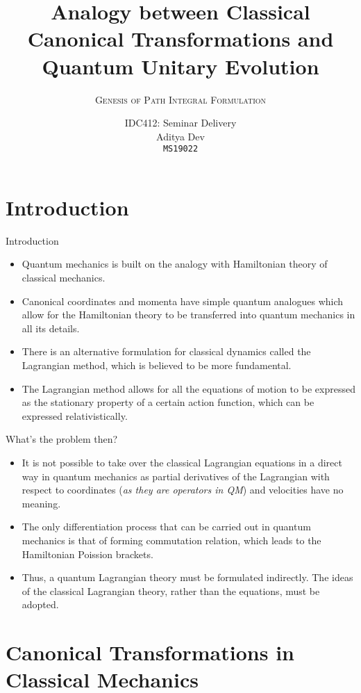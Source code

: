 \documentclass{beamer}
\title{Analogy between Classical Canonical Transformations and Quantum Unitary Evolution}
\author[Abbr]{\large{IDC412: Seminar Delivery} \\
  [5pt] {\Large Aditya Dev} \\
  [5pt] \texttt{MS19022}}
\subtitle{\textsc{Genesis of Path Integral Formulation}}
\institute{%
 {Department of Physical Sciences}\\
 [5pt]\textsc{Indian Institute of Science Education and Research Mohali} \\
        [5pt]{Email: \texttt{ms19022@iisermohali.ac.in} }
        }
\begin{document}

\typesetFrontSlides

%
%
    
\section{Introduction}



\begin{frame}{Introduction}
\begin{itemize}
    \item  Quantum mechanics is built on the analogy with Hamiltonian theory of classical mechanics.
    \item  Canonical coordinates and momenta have simple quantum analogues which allow for the Hamiltonian theory to be transferred into quantum mechanics in all its details.
    \item There is an alternative formulation for classical dynamics called the Lagrangian method, which is believed to be more fundamental.
    \item The Lagrangian method allows for all the equations of motion to be expressed as the stationary property of a certain action function, which can be expressed relativistically.
\end{itemize}
\end{frame}
\begin{frame}{What's the problem then?}
 \begin{itemize}
     \item It is not possible to take over the classical Lagrangian equations in a direct way in quantum mechanics as partial derivatives of the Lagrangian with respect to coordinates (\textit{as they are operators in QM}) and velocities have no meaning.
    \item The only differentiation process that can be carried out in quantum mechanics is that of forming commutation relation, which leads to the Hamiltonian Poission brackets. 
    \item Thus, a quantum Lagrangian theory must be formulated indirectly. The ideas of the classical Lagrangian theory, rather than the equations, must be adopted.
 \end{itemize}
\end{frame}

\section{Canonical Transformations in Classical Mechanics}
\end{document}
